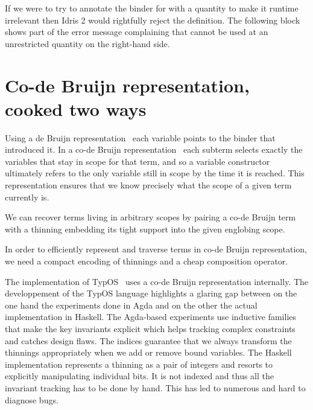 \documentclass{article}
\newcommand{\typos}{TypOS}
\newcommand{\idris}{Idris 2}
\begin{document}
If we were to try to annotate the binder for  with a 
quantity to make it runtime irrelevant then \idris{} would
rightfully reject the definition.
%
The following  block shows part of the error message complaining
that  cannot be used at an unrestricted quantity on the right-hand side.



\section{Co-de Bruijn representation, cooked two ways}

Using a de Bruijn representation~\cite{MANUAL:journals/math/debruijn72} each variable
points to the binder that introduced it. In a co-de Bruijn
representation~\cite{DBLP:journals/corr/abs-1807-04085} each subterm
selects exactly the variables that stay in scope for that term,
and so a variable constructor ultimately refers to the only variable still
in scope by the time it is reached.
%
This representation ensures that we know precisely what the scope of a given term
currently is.

We can recover terms living in arbitrary scopes by pairing a co-de Bruijn term
with a thinning embedding its tight support into the given englobing scope.


In order to efficiently represent and traverse terms in co-de Bruijn representation,
we need a compact encoding of thinnings and a cheap composition operator.

The implementation of \typos~\cite{MANUAL:talk/types/Allais22} uses a co-de Bruijn
representation internally. 
%
The developpement of the \typos{} language highlights a glaring gap between on the
one hand the experiments done in Agda and on the other the actual implementation
in Haskell.
%
The Agda-based experiments use inductive families that make the key invariants explicit
which helps tracking complex constraints and catches design flaws. The indices guarantee
that we always transform the thinnings appropriately when we add or remove bound variables.
%
The Haskell implementation represents a thinning as a pair of integers and resorts to
explicitly manipulating individual bits. It is not indexed and thus all the invariant
tracking has to be done by hand. This has led to numerous and hard to diagnose bugs.
\end{document}
